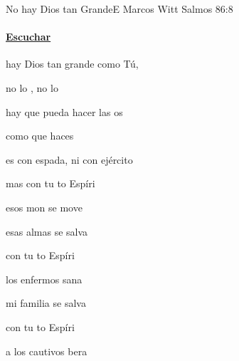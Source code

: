 \documentclass[12pt, spanish]{book}
\begin{document}
    \begin{song}{No hay Dios tan Grande}{E}
        {} %
        {Marcos Witt}
        {Salmos 86:8} %
        {} %
        \ifChordBk
        \paragraph{\mbox{}\hfill\protect\href{https://open.spotify.com/intl-es/track/20kHKZQynOKbDwQXtdyhy9}{Escuchar}\mbox{}\hfill}
        \fi
        \begin{SBOpGroup}
             hay Dios tan grande como Tú,

            no lo , no lo 
        \end{SBOpGroup}

        \begin{SBOpGroup}
             hay  que pueda hacer las os

            como  que haces 
        \end{SBOpGroup}

        \begin{SBOpGroup}
             es con espada, ni con ejército

            mas con tu to Espíri
        \end{SBOpGroup}

        \begin{SBOpGroup}
             esos mon se move

             esas almas se salva

            con tu to Espíri
        \end{SBOpGroup}

        \begin{SBOpGroup}
             los enfermos  sana

             mi familia se salva

            con tu to Espíri
        \end{SBOpGroup}

        \begin{SBOpGroup}
             a los cautivos bera


\end{SBOpGroup}
\end{song}
\end{document}
